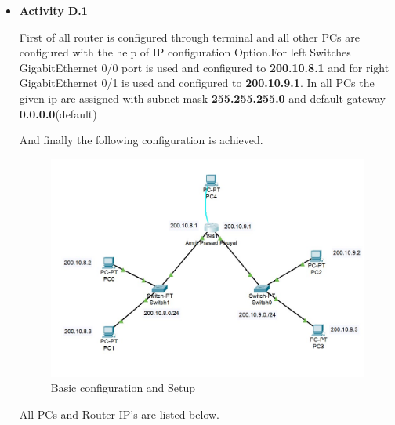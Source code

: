 \documentclass[a4paper,12pt]{article}
\begin{document}
\begin{itemize}
      \item \textbf{Activity D.1}

            First of all router is configured through terminal and all other PCs are configured with the help of IP configuration Option.For left  Switches GigabitEthernet 0/0 port is used and configured to \textbf{200.10.8.1} and for right GigabitEthernet 0/1 is used and configured to \textbf{200.10.9.1}. In all PCs the given ip are assigned with subnet mask \textbf{255.255.255.0} and default gateway \textbf{0.0.0.0}(default)


            And finally the following configuration is achieved.
            \begin{figure}[H]
                  \centering
                  \includegraphics[scale=0.75,cframe=blue 0.5pt 3pt]{basic config.jpg}
                  \caption{Basic configuration and Setup}
            \end{figure}
            All PCs and Router IP's are listed below.


\end{itemize}
\end{document}
